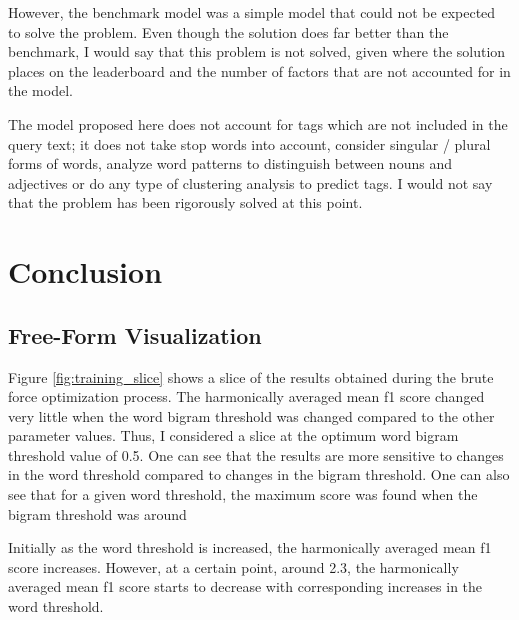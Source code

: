 \documentclass{article}
\begin{document}
However, the benchmark model was a simple model that could not be expected to
solve the problem. Even though the solution does far better than the
benchmark, I would say that this problem is not solved, given where the
solution places on the leaderboard and the number of factors that are not
accounted for in the model.

The model proposed here does not account for tags which are not included in
the query text; it does not take stop words into account, consider singular
/ plural forms of words, analyze word patterns to distinguish between nouns
and adjectives or do any type of clustering analysis to predict tags. I would
not say that the problem has been rigorously solved at this point.



\section{Conclusion}

\subsection{Free-Form Visualization}

Figure \ref{fig:training_slice} shows a slice of the results obtained during
the brute force optimization process. The harmonically averaged mean f1 score
changed very little when the word bigram threshold was changed compared to the
other parameter values. Thus, I considered a slice at the optimum word bigram
threshold value of 0.5. One can see that the results are more sensitive to
changes in the word threshold compared to changes in the bigram
threshold. One can also see that for a given word threshold, the maximum score
was found when the bigram threshold was around 

Initially as the word threshold is increased, the harmonically averaged mean
f1 score increases. However, at a certain point, around 2.3, the harmonically
averaged mean f1 score starts to decrease with corresponding increases in the
word threshold.
\end{document}
